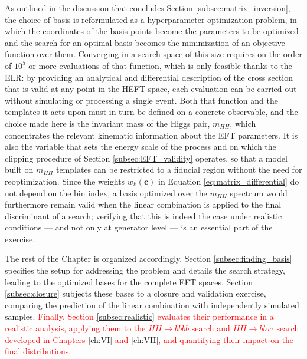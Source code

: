 As outlined in the discussion that concludes Section \ref{subsec:matrix_inversion}, the choice of basis is reformulated as a hyperparameter optimization problem, in which the coordinates of the basis points become the parameters to be optimized and the search for an optimal basis becomes the minimization of an objective function over them. Converging in a search space of this size requires on the order of $10^5$ or more evaluations of that function, which is only feasible thanks to the ELR: by providing an analytical and differential description of the cross section that is valid at any point in the HEFT space, each evaluation can be carried out without simulating or processing a single event. Both that function and the templates it acts upon must in turn be defined on a concrete observable, and the choice made here is the invariant mass of the Higgs pair, $m_{HH}$, which concentrates the relevant kinematic information about the EFT parameters. It is also the variable that sets the energy scale of the process and on which the clipping procedure of Section \ref{subsec:EFT_validity} operates, so that a model built on $m_{HH}$ templates can be restricted to a fiducial region without the need for reoptimization. Since the weights $w_k(\mathbf{c})$ in Equation \ref{eq:matrix_differential} do not depend on the bin index, a basis optimized over the $m_{HH}$ spectrum would furthermore remain valid when the linear combination is applied to the final discriminant of a search; verifying that this is indeed the case under realistic conditions — and not only at generator level — is an essential part of the exercise.

The rest of the Chapter is organized accordingly. Section \ref{subsec:finding_basis} specifies the setup for addressing the problem and details the search strategy, leading to the optimized bases for the complete EFT spaces. Section \ref{subsec:closure} subjects these bases to a closure and validation exercise, comparing the prediction of the linear combination with independently simulated samples. \textcolor{red}{Finally, Section \ref{subsec:realistic} evaluates their performance in a realistic analysis, applying them to the $HH\to bb\bar{b}\bar{b}$ search and $HH\to b\bar{b}\tau\tau$ search developed in Chapters \ref{ch:VI} and \ref{ch:VII}, and quantifying their impact on the final distributions.}

